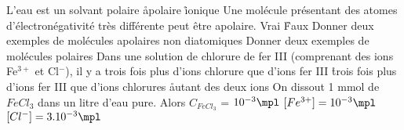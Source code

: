 
\q
L'eau est un solvant
\rv
polaire
\r
apolaire
\r
ionique
\q
Une molécule présentant des atomes d'électronégativité très différente peut être apolaire.
\rv
Vrai
\r
Faux
\q
Donner deux exemples de molécules apolaires non diatomiques
\q
Donner deux exemples de molécules polaires
\q
Dans une solution de chlorure de fer III (comprenant des ions Fe$^{3+}$ et Cl$^-$), il y a
\rv
trois fois plus d'ions chlorure que d'ions fer III
\r
trois fois plus d'ions fer III que d'ions chlorures
\r
autant des deux ions
\q
On dissout 1 mmol de $FeCl_3$ dans un litre d'eau pure. Alors
\rv
$C_{FeCl_3}$ = $10^{-3} \mpl$
\rv
$[Fe^{3+}] = 10^{-3} \mpl$
\rv
$[Cl^{-}] = 3.10^{-3} \mpl$
